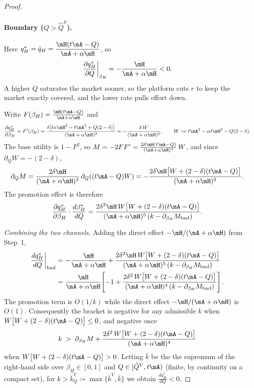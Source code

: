 \begin{proof}
\paragraph{Boundary ($Q>\hat Q^{V}$).} Here $q_H^*=\bar{q}_H=\dfrac{\mH (t\mA-Q)}{\mA+\alpha\mH}$, so
\[
    \frac{\partial q_H^*}{\partial Q}\bigg|_{\beta_H}
    =-\frac{\mH}{\mA+\alpha\mH}<0.
\]
A higher $Q$ saturates the market sooner, so the platform cuts $r$ to keep the
market exactly covered, and the lower rate pulls effort down.


Write
$F(\beta_H)=\frac{\mH (t\mA-Q)}{\mA+\alpha\mH}$ and
\[
    \frac{\partial q_H^*}{\partial \beta_H}
    =F'(\beta_H)
    =\frac{\delta\bigl[t\alpha\mH^{2}-t\mA^{2}+Q(2-\delta)\bigr]}{(\mA+\alpha\mH)^{2}}
    =-\frac{\delta\,W}{(\mA+\alpha\mH)^{2}},
    \qquad W:=t\mA^{2}-\alpha t\mH^{2}-Q(2-\delta).
\]
The base utility is $1-F^{2}$, so $M=-2FF'=\frac{2\delta\mH (t\mA-Q)}{(\mA+\alpha\mH)^{3}}\,W$, and
since $\partial_Q W=-(2-\delta)$,
\[
    \partial_Q M
    =\frac{2\delta\mH}{(\mA+\alpha\mH)^{3}}\,\partial_Q((t\mA-Q)W)
    =-\frac{2\delta\mH\bigl[W+(2-\delta)(t\mA-Q)\bigr]}{(\mA+\alpha\mH)^{3}}.
\]
The promotion effect is therefore
\[
    \frac{\partial q_H^*}{\partial \beta_H}\cdot\frac{d\beta_H^*}{dQ}
    =\frac{2\delta^{2}\mH\,W\bigl[W+(2-\delta)(t\mA-Q)\bigr]}
          {(\mA+\alpha\mH)^{5}\,(k-\partial_{\beta_H}M_{\mathrm{bnd}})}.
\]

\emph{Combining the two channels.} Adding the direct effect $-\mH/(\mA+\alpha\mH)$ from Step~1,
\begin{align*}
    \frac{dq_H^*}{dQ}\bigg|_{\mathrm{bnd}}
    &=-\frac{\mH}{\mA+\alpha\mH}
     +\frac{2\delta^{2}\mH\,W\bigl[W+(2-\delta)(t\mA-Q)\bigr]}{(\mA+\alpha\mH)^{5}\,(k-\partial_{\beta_H}M_{\mathrm{bnd}})}\\
    &=\frac{\mH}{\mA+\alpha\mH}\!\left[-1
        +\frac{2\delta^{2}\,W\bigl[W+(2-\delta)(t\mA-Q)\bigr]}{(\mA+\alpha\mH)^{4}\,(k-\partial_{\beta_H}M_{\mathrm{bnd}})}\right].
\end{align*}
The promotion
term is $O(1/k)$ while the direct effect $-\mH/(\mA+\alpha\mH)$ is $O(1)$. Consequently the bracket is
negative for any admissible $k$ when $W\bigl[W+(2-\delta)(t\mA-Q)\bigr]\le0$, and negative
once
\[
    k\;>\;\partial_{\beta_H}M
        +\frac{2\delta^{2}\,W\bigl[W+(2-\delta)(t\mA-Q)\bigr]}{(\mA+\alpha\mH)^{4}}
\]
when $W\bigl[W+(2-\delta)(t\mA-Q)\bigr]>0$. Letting $\bar k$ be the the supremum of the right-hand side over $\beta_H\in[0,1]$ and
$Q\in[\hat Q^{V},t\mA)$ (finite, by continuity on a compact set), for $k> \bar{k}^V_Q \coloneq \max\{\bar{k}^V,\bar{k}\}$
we obtain $\frac{dq_H^*}{dQ}<0$.


\end{proof}
